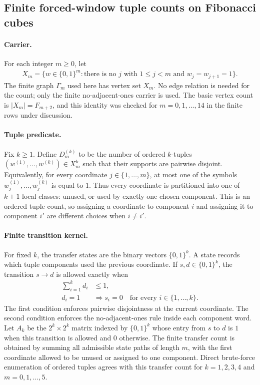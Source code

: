 
\subsection{Finite forced-window tuple counts on Fibonacci cubes}
\label{sec:window-fibonacci-cube-disjoint-tuple-metallic}

\paragraph{Carrier.}
For each integer $m\geq 0$, let
$$
\begin{aligned}
X_m=\{w\in \{0,1\}^m: \text{there is no }j\text{ with }1\leq j<m\text{ and }w_j=w_{j+1}=1\}.
\end{aligned}
$$
The finite graph $\Gamma_m$ used here has vertex set $X_m$.  No edge relation is needed for the count; only the finite no-adjacent-ones carrier is used.  The basic vertex count is $|X_m|=F_{m+2}$, and this identity was checked for $m=0,1,\ldots,14$ in the finite rows under discussion.

\paragraph{Tuple predicate.}
Fix $k\geq 1$.  Define $D^{(k)}_m$ to be the number of ordered $k$-tuples $(w^{(1)},\ldots,w^{(k)})\in X_m^k$ such that their supports are pairwise disjoint.  Equivalently, for every coordinate $j\in\{1,\ldots,m\}$, at most one of the symbols $w^{(1)}_j,\ldots,w^{(k)}_j$ is equal to $1$.  Thus every coordinate is partitioned into one of $k+1$ local classes: unused, or used by exactly one chosen component.  This is an ordered tuple count, so assigning a coordinate to component $i$ and assigning it to component $i'$ are different choices when $i\neq i'$.

\paragraph{Finite transition kernel.}
For fixed $k$, the transfer states are the binary vectors $\{0,1\}^k$.  A state records which tuple components used the previous coordinate.  If $s,d\in\{0,1\}^k$, the transition $s\to d$ is allowed exactly when
$$
\begin{aligned}
\sum_{i=1}^k d_i &\leq 1,\\
d_i=1 &\Longrightarrow s_i=0\quad\text{for every }i\in\{1,\ldots,k\}.
\end{aligned}
$$
The first condition enforces pairwise disjointness at the current coordinate.  The second condition enforces the no-adjacent-ones rule inside each component word.  Let $A_k$ be the $2^k\times 2^k$ matrix indexed by $\{0,1\}^k$ whose entry from $s$ to $d$ is $1$ when this transition is allowed and $0$ otherwise.  The finite transfer count is obtained by summing all admissible state paths of length $m$, with the first coordinate allowed to be unused or assigned to one component.  Direct brute-force enumeration of ordered tuples agrees with this transfer count for $k=1,2,3,4$ and $m=0,1,\ldots,5$.

